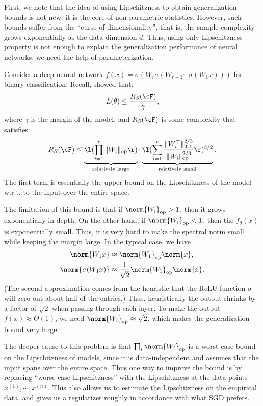 First, we note that the idea of using Lipschitzness to obtain generalization bounds is not new: it is the core of non-parametric statistics. However, such bounds suffer from the ``curse of dimensionality'', that is, the sample complexity grows exponentially as the data dimension $d$. Thus, using only Lipschitzness property is not enough to explain the generalization performance of neural networks: we need the help of parameterization. 

Consider a deep neural network $f(x) = \sigma(W_r\sigma(W_{r-1}\cdots \sigma(W_1x)))$ for binary classification. Recall, \cite{bartlett2017} showed that:
\begin{equation}
L(\theta) \leq \frac{R_S (\cF) }{\gamma},
\end{equation}
where $\gamma$ is the margin of the model, and $R_S (\cF)$ is some complexity that satisfies
\begin{equation}
R_S (\cF) \leq \underbrace{\l(\prod_{i=1}^r\|W_i\|_{\textup{op}} \r)}_{\text{relatively large}} \cdot \underbrace{\l( \sum_{i=1}^r\frac{\|W_i^\top\|^{2/3}_{2,1}}{\|W_i\|_{\textup{op}}^{2/3}}\r)^{3/2}}_{\text{relatively small}}.
\end{equation}
The first term is essentially the upper bound on the Lipschitzness of the model w.r.t. to the input over the entire space. 

The limitation of this bound is that if $\norm{W_i}_{\textup{op}} >1$, then it grows exponentially in depth. On the other hand, if $\norm{W_i}_{\textup{op}} < 1$, then the $f_\theta(x)$ is exponentially small. Thus, it is very hard to make the spectral norm small while keeping the margin large. In the typical case, we have
\begin{align}
    \norm{W_1x} &\approx \norm{W_1}_{\textup{op}}\norm{x}, \\
    \norm{\sigma(W_1x)} &\approx \frac{1}{\sqrt{2}}\norm{W_1}_{\textup{op}}\norm{x}.
\end{align}
(The second approximation comes from the heuristic that the ReLU function $\sigma$ will zero out about half of the entries.) Thus, heuristically the output shrinks by a factor of $\sqrt{2}$ when passing through each layer. To make the output $f(x)\approx \Theta(1)$, we need $\norm{W_i}_{\textup{op}}\approx \sqrt{2}$, which makes the generalization bound very large. 

The deeper cause to this problem is that $\prod_i \norm{W_i}_{\textup{op}}$ is a worst-case bound on the Lipschitzness of models, since it is data-independent and assumes that the input spans over the entire space. Thus one way to improve the bound is by replacing ``worse-case Lipschitzness'' with the Lipschitzness at the data points $x^{(1)}, \cdots, x^{(n)}$. This also allows us to estimate the Lipschitzness on the empirical data, and gives us a regularizer roughly in accordance with what SGD prefers.

